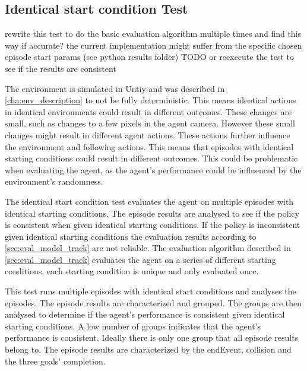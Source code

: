 


\subsection{Identical start condition Test}

rewrite this test to do the basic evaluation algorithm multiple times and find this way if accurate?
the current implementation might suffer from the specific chosen episode start params (see python results folder) TODO
or reexecute the test to see if the results are consistent

The environment is simulated in Untiy and was described in \ref{cha:env_description} to not be fully deterministic. This means identical actions in identical environments could result in different outcomes. These changes are small, such as changes to a few pixels in the agent camera. However these small changes might result in different agent actions. These actions further influence the environment and following actions. This means that episodes with identical starting conditions could result in different outcomes. This could be problematic when evaluating the agent, as the agent's performance could be influenced by the environment's randomness. 

The identical start condition test evaluates the agent on multiple episodes with identical starting conditions. The episode results are analysed to see if the policy is consistent when given identical starting conditions. If the policy is inconsistent given identical starting conditions the evaluation results according to \ref{sec:eval_model_track} are not reliable. The evaluation algorithm described in \ref{sec:eval_model_track} evaluates the agent on a series of different starting conditions, each starting condition is unique and only evaluated once.

This test runs multiple episodes with identical start conditions and analyses the episodes. The episode results are characterized and grouped. The groups are then analysed to determine if the agent's performance is consistent given identical starting conditions. A low number of groups indicates that the agent's performance is consistent. Ideally there is only one group that all episode results belong to.
The episode results are characterized by the endEvent, collision and the three goals' completion.



